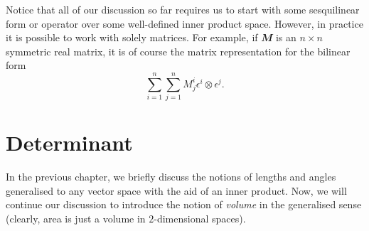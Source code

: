 \documentclass[math, code]{amznotes}
\theoremstyle{remark}
\begin{document}
    Notice that all of our discussion so far requires us to start with some sesquilinear form or operator over some well-defined inner product space. However, in practice it is possible to work with solely matrices. For example, if $\mathbfit{M}$ is an $n \times n$ symmetric real matrix, it is of course the matrix representation for the bilinear form 
    \begin{equation*}
        \sum_{i = 1}^{n}\sum_{j = 1}^{n}M^i_j\epsilon^i \otimes \epsilon^j.
    \end{equation*}
\chapter{Determinant}
In the previous chapter, we briefly discuss the notions of lengths and angles generalised to any vector space with the aid of an inner product. Now, we will continue our discussion to introduce the notion of \textit{volume} in the generalised sense (clearly, area is just a volume in $2$-dimensional spaces).
\end{document}
